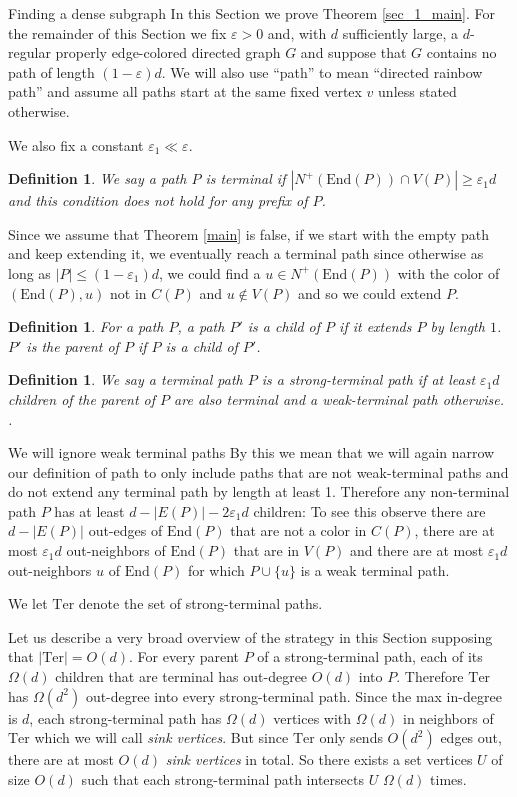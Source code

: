 \documentclass[11pt,a4paper]{article}
\newcounter{foo}
\newtheorem{definition}[foo]{Definition}
\newcommand{\vep}{\varepsilon}
\newcommand{\End}{\mathrm{End}}
\newcommand{\Ter}{\mathrm{Ter}}
\begin{document}
\begin{section}{Finding a dense subgraph}
In this Section we prove Theorem \ref{sec_1_main}. For the remainder of this Section we fix $\vep > 0$ and, with $d$ sufficiently large, a $d$-regular properly edge-colored directed graph $G$ and suppose that $G$ contains no path of length $(1 - \vep)d$. We will also use ``path'' to mean ``directed rainbow path'' and assume all paths start at the same fixed vertex $v$ unless stated otherwise.

\medskip

We also fix a constant $\vep_1 \ll \vep$.
\begin{definition} We say a path $P$ is terminal if $|N^+(\End(P)) \cap V(P)| \geq \vep_1 d$ and this condition does not hold for any prefix of $P$.
\end{definition}
Since we assume that Theorem \ref{main} is false, if we start with the empty path and keep extending it, we eventually reach a terminal path since otherwise as long as $|P| \leq (1 - \vep_1) d$, we could find a $u \in N^{+}(\End(P))$ with the color of $(\End(P), u)$ not in $C(P)$ and $u \not \in V(P)$ and so we could extend $P$.
\begin{definition} For a path $P$, a path $P'$ is a \textit {child} of $P$ if it extends $P$ by length $1$. $P'$ is the \textit{parent} of $P$ if $P$ is a child of $P'$.
\end{definition}
\begin{definition} We say a terminal path $P$ is a strong-terminal path if at least $\vep_1 d$ children of the parent of $P$ are also terminal and a weak-terminal path otherwise. .
\end{definition}
We will ignore weak terminal paths By this we mean that we will again narrow our definition of path to only include paths that are not weak-terminal paths and do not extend any terminal path by length at least 1. Therefore any non-terminal path $P$ has at least $d - |E(P)| - 2 \vep_1 d$ children: To see this observe there are $d - |E(P)|$ out-edges of $\End(P)$ that are not a color in $C(P)$, there are at most $\vep_1 d$ out-neighbors of $\End(P)$ that are in $V(P)$ and there are at most $\vep_1 d$ out-neighbors $u$ of $\End(P)$ for which $P \cup \{u \}$ is a weak terminal path.

\medskip

We let $\Ter$ denote the set of strong-terminal paths.

\medskip

Let us describe a very broad overview of the strategy in this Section supposing that $|\Ter| = O(d)$. For every parent $P$ of a strong-terminal path, each of its $\Omega(d)$ children that are terminal has out-degree $O(d)$ into $P$. Therefore $\Ter$ has $\Omega(d^2)$ out-degree into every strong-terminal path. Since the max in-degree is $d$, each strong-terminal path has $\Omega(d)$ vertices with $\Omega(d)$ in neighbors of $\Ter$ which we will call \textit{sink vertices}. But since $\Ter$ only sends $O(d^2)$ edges out, there are at most $O(d)$ \textit{sink vertices} in total. So there exists a set vertices $U$ of size $O(d)$  such that each strong-terminal path intersects $U$ $\Omega(d)$ times.


\end{section}
\end{document}
